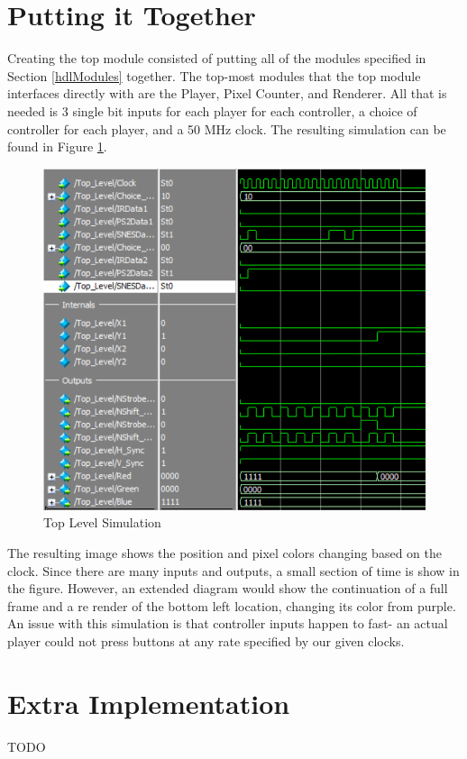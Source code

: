 \documentclass[]{article}
\begin{document}
\section{Putting it Together}
Creating the top module consisted of putting all of the modules specified in Section \ref{hdlModules} together. The top-most modules that the top module interfaces directly with are the Player, Pixel Counter, and Renderer. All that is needed is 3 single bit inputs for each player for each controller, a choice of controller for each player, and a 50 MHz clock. The resulting simulation can be found in Figure \ref{fig:topSim}.
\begin{figure}[H]\centering
    \includegraphics[width=\linewidth]{figures/Top_Sim.png}
    \caption{Top Level Simulation}
    \label{fig:topSim}
\end{figure}
The resulting image shows the position and pixel colors changing based on the clock. Since there are many inputs and outputs, a small section of time is show in the figure. However, an extended diagram would show the continuation of a full frame and a re render of the bottom left location, changing its color from purple.
An issue with this simulation is that controller inputs happen to fast- an actual player could not press buttons at any rate specified by our given clocks.
\section{Extra Implementation}
TODO
\end{document}
